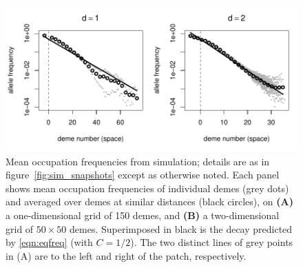 \documentclass{article}
\begin{document}
\begin{figure}[ht!]
  \begin{center}
    \includegraphics{sim-occupation-freqs}
  \end{center}
  \label{fig:sim_occupation_freqs}
  \caption{
  Mean occupation frequencies from simulation; details are as in figure~\ref{fig:sim_snapshots} except as otherwise noted.
  Each panel shows mean occupation frequencies of individual demes (grey dots)
  and averaged over demes at similar distances (black circles), on
  \textbf{(A)} a one-dimensional grid of 150 demes, and
  \textbf{(B)} a two-dimensional grid of $50\times 50$ demes.
  Superimposed in black is the decay predicted by \eqref{eqn:eqfreq} (with $C=1/2$).
  The two distinct lines of grey points in (A) are to the left and right of the patch, respectively.
  }
\end{figure}
\end{document}
